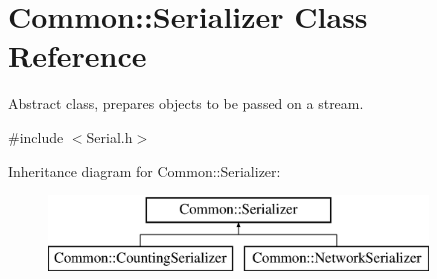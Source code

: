 \hypertarget{class_common_1_1_serializer}{\section{Common\-:\-:Serializer Class Reference}
\label{class_common_1_1_serializer}
}


Abstract class, prepares objects to be passed on a stream.  




{\ttfamily \#include $<$Serial.\-h$>$}

Inheritance diagram for Common\-:\-:Serializer\-:\begin{figure}[H]
\begin{center}
\leavevmode
\includegraphics[height=2.000000cm]{class_common_1_1_serializer}
\end{center}
\end{figure}
